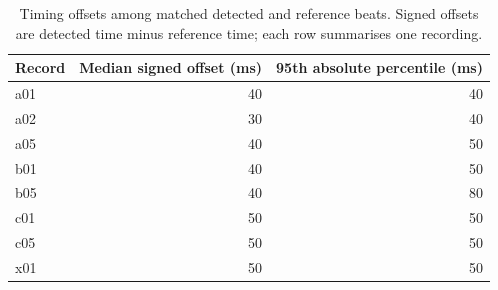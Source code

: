 \begin{table}[htbp]
\centering
\begin{tabular}{lrr}
\toprule
Record & Median signed offset (ms) & 95th absolute percentile (ms) \\
\midrule
a01 & 40 & 40 \\
a02 & 30 & 40 \\
a05 & 40 & 50 \\
b01 & 40 & 50 \\
b05 & 40 & 80 \\
c01 & 50 & 50 \\
c05 & 50 & 50 \\
x01 & 50 & 50 \\
\bottomrule
\end{tabular}
\caption{Timing offsets among matched detected and reference beats. Signed offsets are detected time minus reference time; each row summarises one recording.}
\label{tab:timing}
\end{table}
